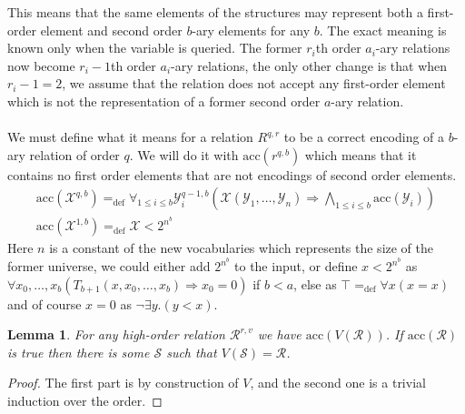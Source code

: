 \documentclass[a4paper,12pt]{article}
\newtheorem{lemma}[theorem]{Lemma}
\theoremstyle{definition}
\newcommand{\mc}{\mathcal}
\newcommand{\ed}{=_{\mathrm{def}}}
\begin{document}
This means that the same elements of the structures may represent both
a first-order element and second order $b$-ary elements for any
$b$. The exact meaning is known only when the variable is queried.
The former $r_{i}$th order $a_{i}$-ary relations now become
$r_{i}-1$th order $a_{i}$-ary relations, the only other change is that
when $r_{i}-1=2$, we assume that the relation does not accept any
first-order element which is not the representation of a former second
order $a$-ary relation.



\paragraph{} We must define what it means for a relation $R^{q,r}$ to
be a correct encoding of a $b$-ary relation of order $q$. We will do
it with $\text{acc}(r^{q,b})$ which means that it contains no first
order elements that are not encodings of second order elements.
\begin{eqnarray}
  \text{acc}(\mc X^{q,b})\ed \forall_{1\le i\le b}\mc Y^{q-1,b}_{i}(\mc X(\mc Y_{1},\dots,\mc Y_{n})\Rightarrow \bigwedge_{1\le i\le b}\text{acc}(\mc Y_{i}))\\
  \text{acc}(\mc X^{1,b})\ed \mc X<2^{n^{b}}
\end{eqnarray}
Here $n$ is a constant of the new vocabularies which represents the size of
the former universe, we could either  add $2^{n^{b}}$ to the
input, or define $x<{}2^{n^{b}}$ as $\forall x_{0},\dots,x_{b}
(T_{b+1}(x,x_{0},\dots,x_{b})\Rightarrow x_{0}=0)$ if $b<a$, else as
$\top\ed \forall x(x=x)$ and of course $x=0$ as $\neg \exists y.(y<x)$.

\begin{lemma}\label{lem:lower}
  For any high-order relation $\mc R^{r,v}$ we have
  $\text{acc}(V(\mc R))$. If $\text{acc}(\mc R)$ is true then
  there is some $\mc S$ such that $V(\mc S)=\mc R$.
\end{lemma}
\begin{proof}
  The first part is by construction of $V$, and the second one is a
  trivial induction over the order.
\end{proof}
\end{document}
